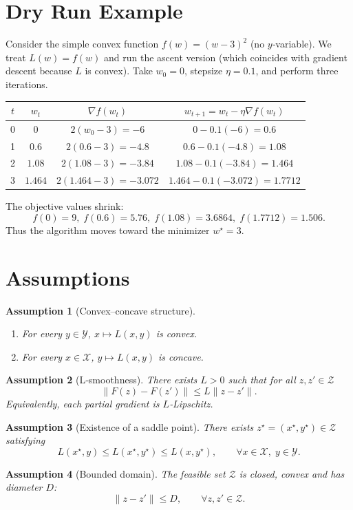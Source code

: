 \documentclass{article}
\newtheorem{assumption}{Assumption}
\newcommand{\grad}{\nabla}
\begin{document}
\section*{Dry Run Example}
Consider the simple convex function $f(w)=(w-3)^{2}$ (no $y$‑variable).  
We treat $L(w)=f(w)$ and run the ascent version (which coincides with gradient descent because $L$ is convex).  
Take $w_{0}=0$, stepsize $\eta=0.1$, and perform three iterations.

\begin{center}
\begin{tabular}{c|c|c|c}
$t$ & $w_{t}$ & $\grad f(w_{t})$ & $w_{t+1}=w_{t}-\eta\grad f(w_{t})$\\ \hline
0 & $0$ & $2(w_{0}-3)=-6$ & $0-0.1(-6)=0.6$\\[2mm]
1 & $0.6$ & $2(0.6-3)=-4.8$ & $0.6-0.1(-4.8)=1.08$\\[2mm]
2 & $1.08$ & $2(1.08-3)=-3.84$ & $1.08-0.1(-3.84)=1.464$\\[2mm]
3 & $1.464$ & $2(1.464-3)=-3.072$ & $1.464-0.1(-3.072)=1.7712$
\end{tabular}
\end{center}
The objective values shrink:
\[
f(0)=9,\; f(0.6)=5.76,\; f(1.08)=3.6864,\; f(1.7712)=1.506.
\]
Thus the algorithm moves toward the minimizer $w^{\star}=3$.

\newpage
\section*{Assumptions}
\begin{assumption}[Convex–concave structure]\label{ass:cc}
\begin{enumerate}
\item For every $y\in\mathcal{Y}$, $x\mapsto L(x,y)$ is convex.
\item For every $x\in\mathcal{X}$, $y\mapsto L(x,y)$ is concave.
\end{enumerate}
\end{assumption}
\begin{assumption}[L‑smoothness]\label{ass:smooth}
There exists $L>0$ such that for all $z,z'\in\mathcal{Z}$
\[
\|F(z)-F(z')\|\le L\|z-z'\|.
\]
Equivalently, each partial gradient is $L$‑Lipschitz.
\end{assumption}
\begin{assumption}[Existence of a saddle point]\label{ass:exist}
There exists $z^{\star}=(x^{\star},y^{\star})\in\mathcal{Z}$ satisfying
\[
L(x^{\star},y)\le L(x^{\star},y^{\star})\le L(x,y^{\star}),\qquad\forall x\in\mathcal{X},\;y\in\mathcal{Y}.
\]
\end{assumption}
\begin{assumption}[Bounded domain]\label{ass:bounded}
The feasible set $\mathcal{Z}$ is closed, convex and has diameter $D$:
\[
\|z-z'\|\le D,\qquad\forall z,z'\in\mathcal{Z}.
\]
\end{assumption}
\end{document}

